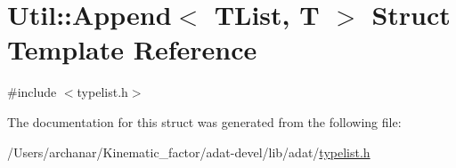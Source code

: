 \hypertarget{structUtil_1_1TL_1_1Append}{}\section{Util\+:\+:Append$<$ T\+List, T $>$ Struct Template Reference}
\label{structUtil_1_1TL_1_1Append}


{\ttfamily \#include $<$typelist.\+h$>$}



The documentation for this struct was generated from the following file\+:\begin{DoxyCompactItemize}
\item 
/\+Users/archanar/\+Kinematic\+\_\+factor/adat-\/devel/lib/adat/\mbox{\hyperlink{adat-devel_2lib_2adat_2typelist_8h}{typelist.\+h}}\end{DoxyCompactItemize}
